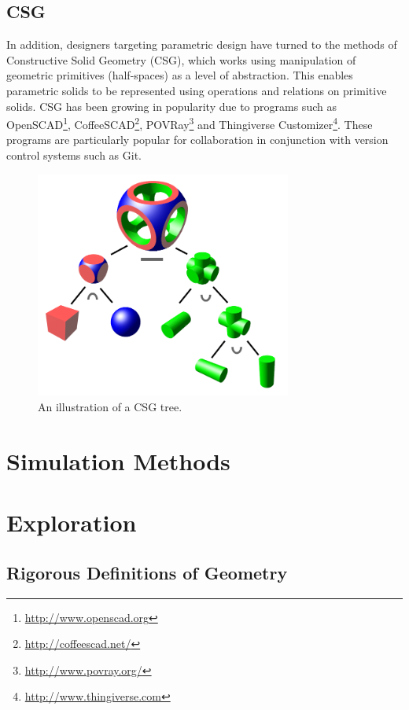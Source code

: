 \documentclass[a4paper]{article}
\begin{document}
\subsection{CSG}

In addition, designers targeting parametric design have turned to the methods
of Constructive Solid Geometry (CSG), which works using manipulation of
geometric primitives (half-spaces) as a level of abstraction.
This enables parametric solids to be represented using operations and
relations on primitive solids. CSG has been growing in popularity due
to programs such as OpenSCAD\footnote{\url{http://www.openscad.org}},
CoffeeSCAD\footnote{\url{http://coffeescad.net/}},
POVRay\footnote{\url{http://www.povray.org/}}
and Thingiverse Customizer\footnote{\url{http://www.thingiverse.com}}.
These programs are particularly popular for collaboration
in conjunction with version control systems such as Git.

\begin{figure}[h!]
  \centering
    \includegraphics[width=0.75\textwidth]{img/csg_tree.png}
  \caption{An illustration of a CSG tree.}
\end{figure}

\section{Simulation Methods}

\section{Exploration}

\subsection{Rigorous Definitions of Geometry}
\end{document}
